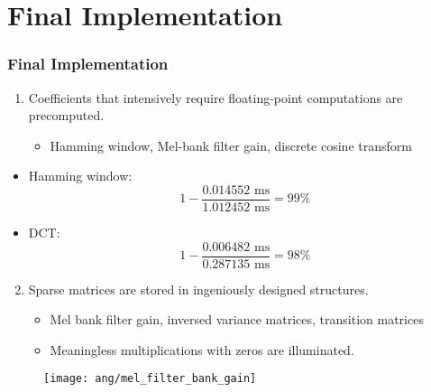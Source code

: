 \section{Final Implementation}


\begin{frame}
\frametitle{Final Implementation}

\begin{enumerate}
	\item Coefficients that intensively require floating-point computations are precomputed.
	\begin{itemize}
		\item Hamming window, Mel-bank filter gain, discrete cosine transform
	\end{itemize}
\end{enumerate}

\begin{itemize}
\item Hamming window:
\begin{equation}
1 - \frac{0.014552 \text{ ms}}{1.012452 \text{ ms}} = 99\%
\end{equation}
\item DCT:
\begin{equation}
1 - \frac{0.006482 \text{ ms}}{0.287135 \text{ ms}} = 98\%
\end{equation}
\end{itemize}
\end{frame}

\begin{frame}
\begin{enumerate}
	\setcounter{enumi}{1}
	\item Sparse matrices are stored in ingeniously designed structures.
	\begin{itemize}
		\item Mel bank filter gain, inversed variance matrices, transition matrices
		\item Meaningless multiplications with zeros are illuminated.
	\end{itemize}
\end{enumerate}

\begin{figure}[H]
\centering
\texttt{[image: ang/mel\_filter\_bank\_gain]}
\end{figure}
\end{frame}


